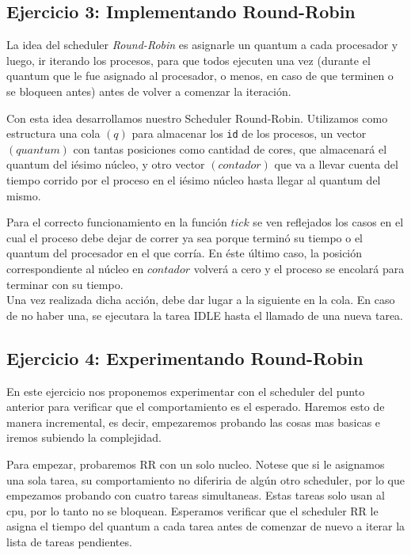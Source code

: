 \subsection{Ejercicio 3: Implementando Round-Robin}
La idea del scheduler \textit{Round-Robin} es asignarle un quantum a cada procesador y luego, ir iterando los procesos, 
para que todos ejecuten una vez (durante el quantum que le fue asignado al procesador, o menos, en caso de que terminen
o se bloqueen antes) antes de volver a comenzar la iteraci\'on.

Con esta idea desarrollamos nuestro Scheduler Round-Robin. Utilizamos como estructura una cola $(q)$ para almacenar los \verb|id| de los procesos, 
un vector $(quantum)$ con tantas posiciones como cantidad de cores, que almacenar\'a el quantum del i\'esimo n\'ucleo, 
y otro vector $(contador)$ que va a llevar cuenta del tiempo corrido por el proceso en el i\'esimo n\'ucleo hasta llegar al quantum del mismo.

Para el correcto funcionamiento en la funci\'on $tick$ se ven reflejados los casos en el cual el proceso debe 
dejar de correr ya sea porque termin\'o su tiempo o el quantum del procesador en el que corr\'ia. En \'este \'ultimo 
caso, la posici\'on correspondiente al n\'ucleo en $contador$ volver\'a a cero y el proceso se encolar\'a para terminar con su tiempo. 
\\Una vez realizada dicha acci\'on, debe dar lugar a la siguiente en la cola. En caso de no haber una, se ejecutara la tarea IDLE hasta el llamado de una nueva tarea.

\subsection{Ejercicio 4: Experimentando Round-Robin}

En este ejercicio nos proponemos experimentar con el scheduler del punto anterior para verificar que el comportamiento es el esperado. Haremos esto de 
manera incremental, es decir, empezaremos probando las cosas mas basicas e iremos subiendo la complejidad. 

Para empezar, probaremos RR con un solo nucleo. Notese que si le asignamos una sola tarea, su comportamiento no diferiria de alg\'un otro scheduler, por
lo que empezamos probando con cuatro tareas simultaneas. Estas tareas solo usan al cpu, por lo tanto no se bloquean. Esperamos 
verificar que el scheduler RR le asigna el tiempo del quantum a cada tarea antes de comenzar de nuevo a iterar la lista de tareas pendientes.

